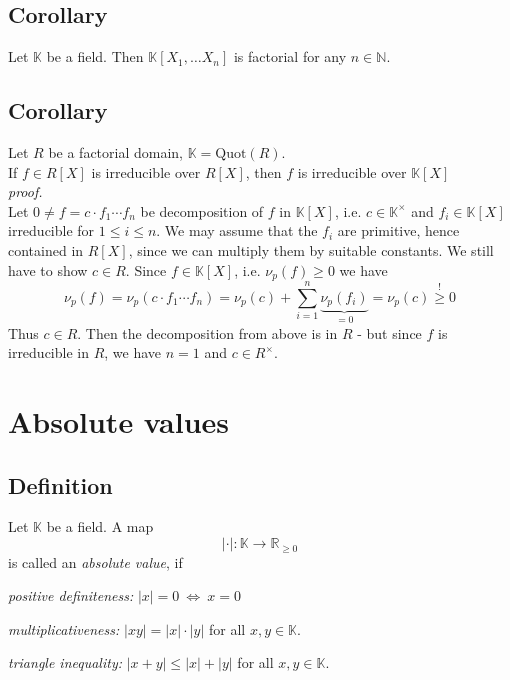 \documentclass[12pt]{book}
\begin{document}
\begin{spacing}{1.3}
\subsection{Corollary} %
Let $\mathbb{K}$ be a field. Then $\mathbb{K}[X_1, \ldots X_n]$ is factorial for any $n \in \mathbb{N}$.\\


\subsection{Corollary} %
Let $R$ be a factorial domain, $\mathbb{K}=\textrm{Quot}(R)$.\\
If $f \in R[X]$ is irreducible over $R[X]$, then $f$ is irreducible over $\mathbb{K}[X]$\\
\textit{proof.}\\
Let $0\neq f = c \cdot f_1 \cdots f_n$ be decomposition of $f$ in $\mathbb{K}[X]$, i.e. $c \in \mathbb{K}^{\times}$ and $f_i \in \mathbb{K}[X]$ irreducible for $1 \leqslant i \leqslant n$. We may assume that the $f_i$ are primitive, hence contained in  $R[X]$, since we can multiply them by suitable constants. We still have to show $c \in R$. Since $f \in \mathbb{K}[X]$, i.e. $\nu_p(f) \geqslant 0$ we have
$$\nu_p(f)=\nu_p(c \cdot f_1 \cdots f_n)=\nu_p(c) + \sum_{i=1}^n \underbrace{\nu_p(f_i)}_{=0}=\nu_p(c)\overset{!}{\geqslant} 0$$
Thus $c \in R$. Then the decomposition from above is in $R$ - but since $f$ is irreducible in $R$, we have $n=1$ and $c \in R^{\times}$.

\renewcommand*\thesection{§ \arabic{section}\quad}
\section{Absolute values}
\renewcommand*\thesection{\arabic{section}}

\subsection{Definition} %
Let $\mathbb{K}$ be a field. A map $$| \cdot |: \mathbb{K} \longrightarrow \mathbb{R}_{\geqslant 0}$$ is called an \textit{absolute value}, if
\begin{compactenum}
\item \textit{positive definiteness:} $|x|=0 \ \Longleftrightarrow \ x=0$
\item \textit{multiplicativeness:} $|xy|=|x|\cdot |y|$ for all $x,y \in \mathbb{K}$.
\item \textit{triangle inequality:} $|x+y| \leqslant |x|+|y|$ for all $x,y \in \mathbb{K}$.
\end{compactenum}


\end{spacing}
\end{document}

